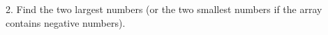 \documentclass[preview]{standalone}
\begin{document}
2. Find the two largest numbers (or the two smallest numbers if the array contains negative numbers).\\
\end{document}
